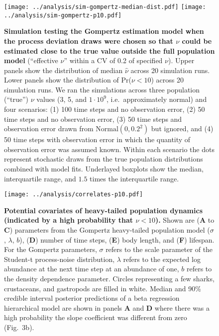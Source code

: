 \documentclass[12pt]{article}
\begin{document}
\begin{figure}[htbp]
\begin{center}
\texttt{[image: ../analysis/sim-gompertz-median-dist.pdf]}
\texttt{[image: ../analysis/sim-gompertz-p10.pdf]}

\caption{\textbf{Simulation testing the Gompertz estimation model when the process deviation draws were chosen so that $\nu$ could be estimated close to the true value outside the full population model} (``effective $\nu$'' within a CV of 0.2 of specified $\nu$). Upper panels show the distribution of median $\widehat{\nu}$ across 20 simulation runs. Lower panels show the distribution of Pr($\nu < 10$) across 20 simulation runs. We ran the simulations across three population (``true'') $\nu$ values (3, 5, and $1\cdot 10^9$, i.e.\ approximately normal) and four scenarios: (1) 100 time steps and no observation error, (2) 50 time steps and no observation error, (3) 50 time steps and observation error drawn from $\mathrm{Normal} (0, 0.2^2)$ but ignored, and (4) 50 time steps with observation error in which the quantity of observation error was assumed known. Within each scenario the dots represent stochastic draws from the true population distributions combined with model fits. Underlayed boxplots show the median, interquartile range, and $1.5$ times the interquartile range.}

\label{fig:sim-prob}
\end{center}
\end{figure}

\begin{figure}[htbp]
\begin{center}
\texttt{[image: ../analysis/correlates-p10.pdf]}

\caption{\textbf{Potential covariates of heavy-tailed population dynamics (indicated by a high probability that $\nu < 10$).} Shown are (\textbf{A} to \textbf{C}) parameters from the Gompertz heavy-tailed population model ($\sigma$, $\lambda$, $b$), (\textbf{D}) number of time steps, (\textbf{E}) body length, and (\textbf{F}) lifespan. For the Gompertz parameters, $\sigma$ refers to the scale parameter of the Student-t process-noise distribution, $\lambda$ refers to the expected log abundance at the next time step at an abundance of one, $b$ refers to the density dependence parameter. Circles representing a few sharks, crustaceans, and gastropods are filled in white. Median and 90\% credible interval posterior predictions of a beta regression hierarchical model are shown in panels \textbf{A} and \textbf{D} where there was a high probability the slope coefficient was different from zero (Fig.~3b).}

\label{fig:correlates}
\end{center}
\end{figure}
\end{document}
